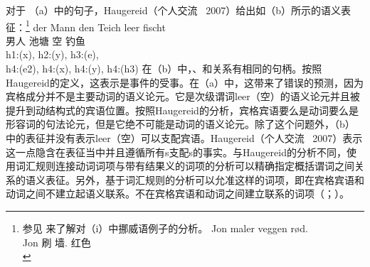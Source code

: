 \begin{exe}
\begin{xlist}[iv.]
\begin{exe}
\begin{xlist}[iv.]
对于 （a）中的句子，Haugereid（个人交流 \, 2007）给出如（b）所示的语义表征：\footnote{%
  参见 来了解对（i）中挪威语例子的分析。
\ea
\gll Jon maler veggen rød.\\
     Jon 刷 墙. 红色\\
\zlast
}
\eal
\ex 
\gll der Mann den Teich leer fischt\\
	  男人  池塘 空 钓鱼\\
\ex h1:(x), h2:(y), h3:(e),\\
    h4:(e2), h4:(x), h4:(y), h4:(h3)
\zl
在（b）中，、和关系有相同的句柄。按照Haugereid的定义，这表示是事件的受事。在（a）中，这带来了错误的预测，因为宾格成分并不是主要动词的语义论元。它是次级谓词leer（空）的语义论元并且被提升到动结构式的宾语位置。按照Haugereid的分析，宾格宾语要么是动词要么是形容词的句法论元，但是它绝不可能是动词的语义论元。除了这个问题外，（b）中的表征并没有表示leer（空）可以支配宾语。Haugereid（个人交流 \, 2007）表示这一点隐含在表征当中并且遵循所有s支配s的事实。与Haugereid的分析不同，使用词汇规则连接动词词项与带有结果义的词项的分析可以精确指定概括谓词之间关系的语义表征。另外，基于词汇规则的分析可以允准这样的词项，即在宾格宾语和动词之间不建立起语义联系。不在宾格宾语和动词之间建立联系的词项（\citealp{Wechsler97a,WN2001a}；\citealp[\S~5]{Mueller2002b}）。

\end{xlist}
\end{exe}
\end{xlist}
\end{exe}
